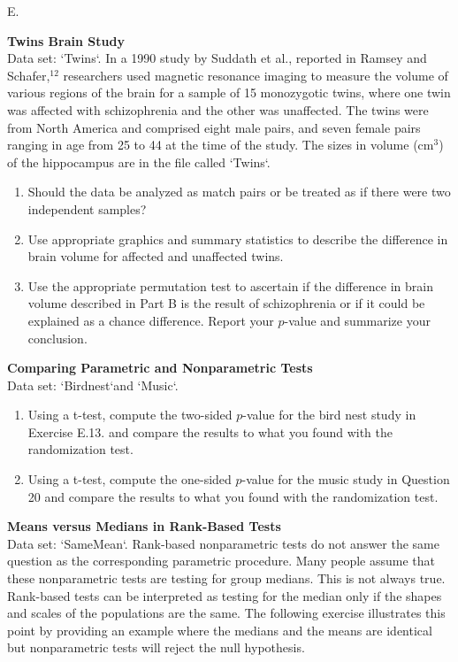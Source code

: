 \documentclass[
]{report}
\newcounter{excount}
\renewcommand{\theexcount}{E\arabic{excount}}
\begin{document}
\begin{list}{\theexcount.}{ \setlength{\itemsep}{0.5em}}
  
  \item \textbf{Twins Brain Study} \\
  Data set: `Twins`. In a 1990 study by Suddath et al., reported in Ramsey and Schafer,$^{12}$ researchers used magnetic resonance imaging to measure the volume of various regions of the brain for a sample of 15 monozygotic twins, where one twin was affected with schizophrenia and the other was unaffected. The twins were from North America and comprised eight male pairs, and seven female pairs ranging
in age from 25 to 44 at the time of the study. The sizes in volume (cm$^3$) of the hippocampus are in the file called `Twins`.
  \begin{enumerate}
    \setcounter{enumi}{0}  
    \item Should the data be analyzed as match pairs or be treated as if there were two independent
samples?
    \item Use appropriate graphics and summary statistics to describe the difference in brain volume for
affected and unaffected twins.
    \item Use the appropriate permutation test to ascertain if the difference in brain volume described in
Part B is the result of schizophrenia or if it could be explained as a chance difference. Report
your $p$-value and summarize your conclusion.
  \end{enumerate}
  
  
  \item \textbf{Comparing Parametric and Nonparametric Tests} \\
  Data set: `Birdnest`and `Music`.
  \begin{enumerate}
    \setcounter{enumi}{0}  
    \item Using a t-test, compute the two-sided $p$-value for the bird nest study in Exercise E.13. and compare the results to what you found with the randomization test.
    \item Using a t-test, compute the one-sided $p$-value for the music study in Question 20 and compare the
results to what you found with the randomization test.
  \end{enumerate}
  
  
  
  
  \item \textbf{Means versus Medians in Rank-Based Tests} \\
  Data set: `SameMean`. Rank-based nonparametric tests do not answer the same question as the corresponding parametric procedure. Many people assume that these nonparametric tests are testing for group medians. This is not always true. Rank-based tests can be interpreted as testing for the median only if the shapes and scales of the populations are the same. The following exercise illustrates this point by providing an example where the medians and the means are identical but nonparametric tests will reject the null hypothesis.


\end{list}
\end{document}
